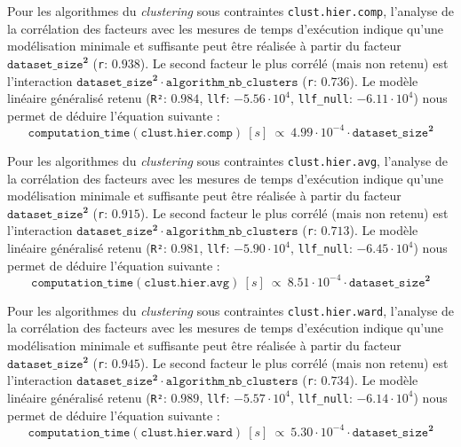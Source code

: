 			Pour les algorithmes du \textit{clustering} sous contraintes \texttt{clust.hier.comp}, l'analyse de la corrélation des facteurs avec les mesures de temps d'exécution indique qu'une modélisation minimale et suffisante peut être réalisée à partir du facteur $\texttt{dataset\_size}^{\textbf{2}}$ (\texttt{r}: $0.938$).
			Le second facteur le plus corrélé (mais non retenu) est l'interaction $\texttt{dataset\_size}^{\textbf{2}} \cdot \texttt{algorithm\_nb\_clusters}$ (\texttt{r}: $0.736$).
			Le modèle linéaire généralisé retenu (\texttt{R²}: $0.984$, \texttt{llf}: $-5.56 \cdot 10^{4}$, \texttt{llf\_null}: $-6.11 \cdot 10^{4}$) nous permet de déduire l'équation suivante :
			\begin{equation}
				\texttt{computation\_time}(\texttt{clust.hier.comp})~[s]~
				\propto~4.99 \cdot 10^{-4} \cdot \texttt{dataset\_size}^{\textbf{2}}
			\end{equation}

			Pour les algorithmes du \textit{clustering} sous contraintes \texttt{clust.hier.avg}, l'analyse de la corrélation des facteurs avec les mesures de temps d'exécution indique qu'une modélisation minimale et suffisante peut être réalisée à partir du facteur $\texttt{dataset\_size}^{\textbf{2}}$ (\texttt{r}: $0.915$).
			Le second facteur le plus corrélé (mais non retenu) est l'interaction $\texttt{dataset\_size}^{\textbf{2}} \cdot \texttt{algorithm\_nb\_clusters}$ (\texttt{r}: $0.713$).
			Le modèle linéaire généralisé retenu (\texttt{R²}: $0.981$, \texttt{llf}: $-5.90 \cdot 10^{4}$, \texttt{llf\_null}: $-6.45 \cdot 10^{4}$) nous permet de déduire l'équation suivante :
			\begin{equation}
				\texttt{computation\_time}(\texttt{clust.hier.avg})~[s]~
				\propto~8.51 \cdot 10^{-4} \cdot \texttt{dataset\_size}^{\textbf{2}}
			\end{equation}

			Pour les algorithmes du \textit{clustering} sous contraintes \texttt{clust.hier.ward}, l'analyse de la corrélation des facteurs avec les mesures de temps d'exécution indique qu'une modélisation minimale et suffisante peut être réalisée à partir du facteur $\texttt{dataset\_size}^{\textbf{2}}$ (\texttt{r}: $0.945$).
			Le second facteur le plus corrélé (mais non retenu) est l'interaction $\texttt{dataset\_size}^{\textbf{2}} \cdot \texttt{algorithm\_nb\_clusters}$ (\texttt{r}: $0.734$).
			Le modèle linéaire généralisé retenu (\texttt{R²}: $0.989$, \texttt{llf}: $-5.57 \cdot 10^{4}$, \texttt{llf\_null}: $-6.14 \cdot 10^{4}$) nous permet de déduire l'équation suivante :
			\begin{equation}
				\texttt{computation\_time}(\texttt{clust.hier.ward})~[s]~
				\propto~5.30 \cdot 10^{-4} \cdot \texttt{dataset\_size}^{\textbf{2}}
			\end{equation}
			
